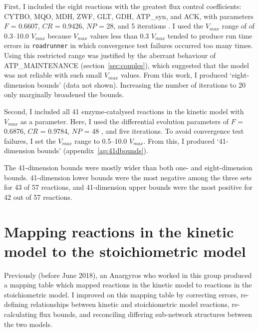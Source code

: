 \documentclass[parskip=full, numbers=noenddot]{scrreprt}
\begin{document}
First, I included the eight reactions with the greatest flux control coefficients: CYTBO, MQO, MDH, ZWF, GLT, GDH, ATP\_syn, and ACK, with parameters $F$ = 0.6607, $CR$ = 0.9426, $NP$ = 28, and 5 iterations \citep{pedersen_good_2010}. I used the $V_{max}$ range of of 0.3--10.0 $V_{max}$ because $V_{max}$ values less than 0.3 $V_{max}$ tended to produce run time errors in \texttt{roadrunner} in which convergence test failures occurred too many times. Using this restricted range was justified by the aberrant behaviour of ATP\_MAINTENANCE (section~\ref{sec:couples}), which suggested that the model was not reliable with such small $V_{max}$ values. From this work, I produced `eight-dimension bounds' (data not shown). Increasing the number of iterations to 20 only marginally broadened the bounds.

Second, I included all 41 enzyme-catalysed reactions in the kinetic model with $V_{max}$ as a parameter. Here, I used the differential evolution parameters of $F$ = 0.6876, $CR$ = 0.9784, $NP$ = 48 \citep{pedersen_good_2010}, and five iterations. To avoid convergence test failures, I set the $V_{max}$ range to 0.5--10.0 $V_{max}$. From this, I produced `41-dimension bounds' (appendix~\ref{ap:41dbounds}).

The 41-dimension bounds were mostly wider than both one- and eight-dimension bounds. 41-dimension lower bounds were the most negative among the three sets for 43 of 57 reactions, and 41-dimension upper bounds were the most positive for 42 out of 57 reactions.

\section{Mapping reactions in the kinetic model to the stoichiometric model}
\label{sec:mapping}

Previously (before June 2018), an Anargyros who worked in this group produced a mapping table which mapped reactions in the kinetic model to reactions in the stoichiometric model. %
I improved on this mapping table by correcting errors, re-defining relationships between kinetic and stoichiometric model reactions, re-calculating flux bounds, and reconciling differing sub-network structures between the two models.
\end{document}
